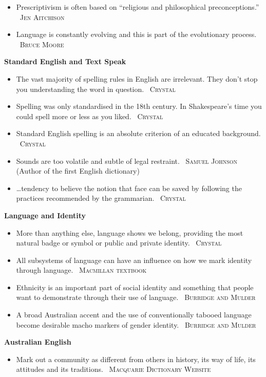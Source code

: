 \documentclass[10pt, a4paper]{article}
\newcommand{\heading}[1]{\textbf{#1}}
\newcommand{\linguist}[1]{\textemdash~\textsc{#1}}
\begin{document}
\begin{multicols}{2}
\begin{itemize}
    \item Prescriptivism is often based on ``religious and philosophical preconceptions.'' \linguist{Jen Aitchison}
    \item Language is constantly evolving and this is part of the evolutionary process. \linguist{Bruce Moore}
  \end{itemize}
  \heading{Standard English and Text Speak}
  \begin{itemize}
    \item The vast majority of spelling rules in English are irrelevant. They don't stop you understanding the word in question. \linguist{Crystal}
    \item Spelling was only standardised in the 18th century. In Shakespeare's time you could spell more or less as you liked. \linguist{Crystal}
    \item Standard English spelling is an absolute criterion of an educated background. \linguist{Crystal}
    \item Sounds are too volatile and subtle of legal restraint. \linguist{Samuel Johnson} (Author of the first English dictionary)
    \item \dots tendency to believe the notion that face can be saved by following the practices recommended by the grammarian. \linguist{Crystal}
  \end{itemize}
  \heading{Language and Identity}
  \begin{itemize}
    \item More than anything else, language shows we belong, providing the most natural badge or symbol or public and private identity. \linguist{Crystal}
    \item All subsystems of language can have an influence on how we mark identity through language. \linguist{Macmillan textbook}
    \item Ethnicity is an important part of social identity and something that people want to demonstrate through their use of language. \linguist{Burridge and Mulder}
    \item A broad Australian accent and the use of conventionally tabooed language become desirable macho markers of gender identity. \linguist{Burridge and Mulder}
  \end{itemize}
  \columnbreak
  \heading{Australian English}
  \begin{itemize}
    \item Mark out a community as different from others in history, its way of life, its attitudes and its traditions. \linguist{Macquarie Dictionary Website}

\end{itemize}
\end{multicols}
\end{document}
